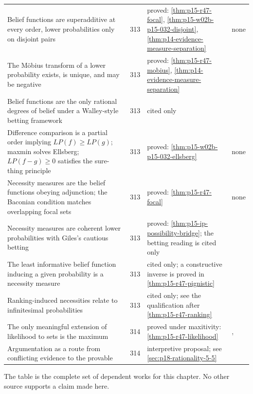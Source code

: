 \begin{longtable}{@{}p{.36\linewidth}p{.07\linewidth}p{.27\linewidth}p{.22\linewidth}@{}}
Belief functions are superadditive at every order, lower probabilities
only on disjoint pairs & 313 & proved: \cref{thm:p15-r47-focal},
\cref{thm:p15-w02b-p15-032-disjoint},
\cref{thm:p14-evidence-measure-separation} & none \\
The M\"obius transform of a lower probability exists, is unique, and may be
negative & 313 & proved: \cref{thm:p15-r47-mobius},
\cref{thm:p14-evidence-measure-separation} & \cite{R47ChateauneufJaffray1989} \\
Belief functions are the only rational degrees of belief under a
Walley-style betting framework & 313 & cited only &
\cite{R47KerkvlietMeester2018} \\
Difference comparison is a partial order implying \(LP(f)\geq LP(g)\);
maxmin solves Ellsberg; \(LP(f-g)\geq0\) satisfies the sure-thing principle &
313 & proved: \cref{thm:p15-w02b-p15-032-ellsberg} & none \\
Necessity measures are the belief functions obeying adjunction; the
Baconian condition matches overlapping focal sets & 313 & proved:
\cref{thm:p15-r47-focal} & none \\
Necessity measures are coherent lower probabilities with Giles's cautious
betting & 313 & proved: \cref{thm:p15-ip-possibility-bridge}; the betting
reading is cited only & \cite{R47Giles1982} \\
The least informative belief function inducing a given probability is a
necessity measure & 313 & cited only; a constructive inverse is proved in
\cref{thm:p15-r47-pignistic} & \cite{R47DuboisPradeSmets2008} \\
Ranking-induced necessities relate to infinitesimal probabilities & 313 &
cited only; see the qualification after \cref{thm:p15-r47-ranking} &
\cite{R47Spohn1990} \\
The only meaningful extension of likelihood to sets is the maximum & 314 &
proved under maxitivity: \cref{thm:p15-r47-likelihood} &
\cite{R47DuboisMoralPrade1997}, \cite{R47Dubois2006} \\
Argumentation as a route from conflicting evidence to the provable & 314 &
interpretive proposal; see \cref{sec:p18-rationality-5-5} & \cite{R47Haenni2009} \\
\bottomrule\end{longtable}

The table is the complete set of dependent works for this chapter. No
other source supports a claim made here.

